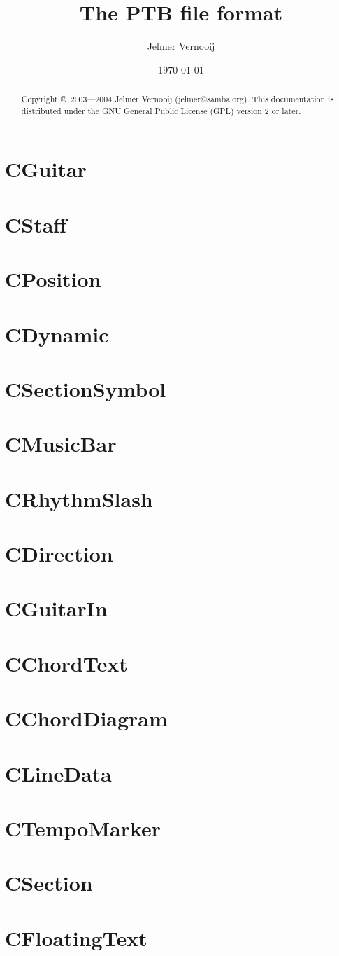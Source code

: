 \documentclass[a4paper]{article}
\begin{document}
\title{The PTB file format}
\date{\today}
\author{Jelmer Vernooij}
\maketitle

\begin{abstract}
    Copyright \copyright\ 2003---2004  Jelmer Vernooij (jelmer@samba.org).
	This documentation is distributed under the GNU General Public License (GPL) version 2 or later.
\end{abstract}

\lstset{language=C}

\tableofcontents

\section{CGuitar}
\section{CStaff}
\section{CPosition}
\section{CDynamic}
\section{CSectionSymbol}
\section{CMusicBar}
\section{CRhythmSlash}
\section{CDirection}
\section{CGuitarIn}
\section{CChordText}
\section{CChordDiagram}
\section{CLineData}
\section{CTempoMarker}
\section{CSection}
\section{CFloatingText}
\end{document}
